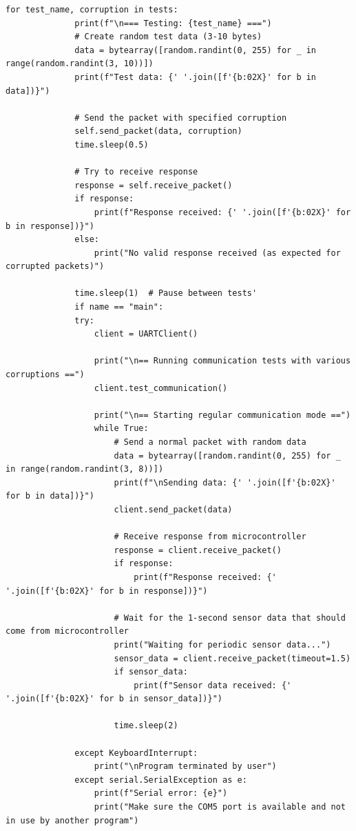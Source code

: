 \documentclass{article}
\begin{document}
\begin{lstlisting}[caption={client}, label={lst:example}]
          for test_name, corruption in tests:
              print(f"\n=== Testing: {test_name} ===")
              # Create random test data (3-10 bytes)
              data = bytearray([random.randint(0, 255) for _ in range(random.randint(3, 10))])
              print(f"Test data: {' '.join([f'{b:02X}' for b in data])}")
              
              # Send the packet with specified corruption
              self.send_packet(data, corruption)
              time.sleep(0.5)
              
              # Try to receive response
              response = self.receive_packet()
              if response:
                  print(f"Response received: {' '.join([f'{b:02X}' for b in response])}")
              else:
                  print("No valid response received (as expected for corrupted packets)")
              
              time.sleep(1)  # Pause between tests'
              if name == "main":
              try:
                  client = UARTClient()
                  
                  print("\n== Running communication tests with various corruptions ==")
                  client.test_communication()
                  
                  print("\n== Starting regular communication mode ==")
                  while True:
                      # Send a normal packet with random data
                      data = bytearray([random.randint(0, 255) for _ in range(random.randint(3, 8))])
                      print(f"\nSending data: {' '.join([f'{b:02X}' for b in data])}")
                      client.send_packet(data)
                      
                      # Receive response from microcontroller
                      response = client.receive_packet()
                      if response:
                          print(f"Response received: {' '.join([f'{b:02X}' for b in response])}")
                          
                      # Wait for the 1-second sensor data that should come from microcontroller
                      print("Waiting for periodic sensor data...")
                      sensor_data = client.receive_packet(timeout=1.5)
                      if sensor_data:
                          print(f"Sensor data received: {' '.join([f'{b:02X}' for b in sensor_data])}")
                      
                      time.sleep(2)
                      
              except KeyboardInterrupt:
                  print("\nProgram terminated by user")
              except serial.SerialException as e:
                  print(f"Serial error: {e}")
                  print("Make sure the COM5 port is available and not in use by another program")
\end{lstlisting}
\end{document}

